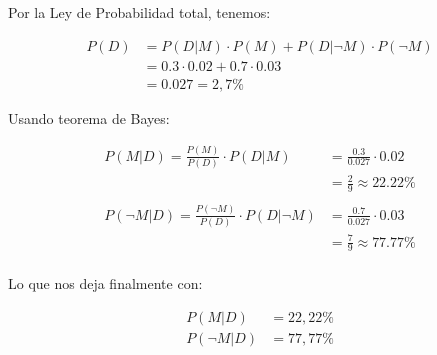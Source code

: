 \documentclass[11pt]{article}
\begin{document}
Por la Ley de Probabilidad total, tenemos:

\[
\begin{align*}

P(D) & = P(D|M) \cdot P(M)  +  P(D|\neg M) \cdot P(\neg M) \\

& = 0.3 \cdot 0.02  +  0.7 \cdot 0.03 \\

& = 0.027 = 2,7\% 

\end{align*}
\]

Usando teorema de Bayes:

\[
\begin{align*}
P(M|D)  = \frac{P(M)}{P(D)} \cdot P(D|M) & = \frac{0.3}{0.027} \cdot 0.02 \\
& = \frac{2}{9} \approx 22.22\% \\
\\
P(\neg M|D)  = \frac{P(\neg M)}{P(D)} \cdot P(D|\neg M) & = \frac{0.7}{0.027} \cdot 0.03 \\
& = \frac{7}{9} \approx 77.77\% \\
\end{align*}
\]

Lo que nos deja finalmente con:

\[
\begin{align*}
P(M|D)  & = 22,22\% \\
P(\neg M|D)  & = 77,77\%
\end{align*}
\]
\end{document}
